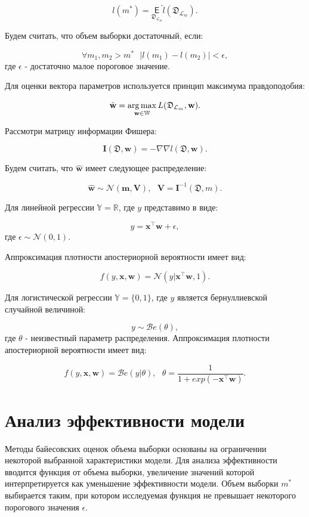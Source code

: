 \documentclass[12pt,twoside]{article}
\begin{document}
$$
l(m^*) = \underset{\mathfrak D_{\mathcal L_m}}{\mathsf E} \tilde{l}(\mathfrak D_{\mathcal L_m}).
$$

Будем считать, что объем выборки достаточный, если:

$$
\forall m_1, m_2 > m^* ~~~ |l(m_1) - l(m_2)| < \epsilon,
$$
где $\epsilon$ - достаточно малое пороговое значение.


Для оценки вектора параметров используется принцип максимума правдоподобия:

$$
\hat{\textbf{w}} = \argmax_{\textbf{w} \in \mathbb{W}} L(\mathfrak D_{\mathcal L_m}, \textbf{w}).
$$

Рассмотри матрицу информации Фишера:

$$
\textbf{I}(\mathfrak D, \textbf{w}) = -\nabla\nabla l(\mathfrak D, \textbf{w}).
$$

Будем считать, что $\hat{\textbf{w}}$ имеет следующее распределение:

$$
\hat{\textbf{w}} \sim \mathcal{N}(\textbf{m}, \textbf{V}),~~~ \textbf{V} = \textbf{I}^{-1}(\mathfrak D, m).
$$

Для линейной регрессии $\mathbb{Y} = \mathbb{R}$, где $y$ представимо в виде:

$$
y = \textbf{x}^{\top}\textbf{w} + \epsilon,
$$
где $\epsilon \sim \mathcal{N}(0, 1)$. 

Аппроксимация плотности апостериорной вероятности имеет вид:

$$
f(y, \textbf{x}, \textbf{w}) = \mathcal{N}(y|\textbf{x}^{\top}\textbf{w}, 1).
$$ 

Для логистической регрессии $\mathbb{Y} = \{0, 1\}$, где $y$ является бернуллиевской случайной величиной:

$$
y \sim \mathcal{B}e(\theta),
$$
где $\theta$ - неизвестный параметр распределения. Аппроксимация плотности апостериорной вероятности имеет вид:

$$
f(y, \textbf{x}, \textbf{w}) = \mathcal{B}e(y|\theta),~~~ \theta = \frac{1}{1 + exp(-\textbf{x}^{\top}\textbf{w})}.
$$

\section{Анализ эффективности модели}

Методы байесовских оценок объема выборки основаны на ограничении некоторой выбранной характеристики модели. Для анализа эффективности вводится функция от объема выборки, увеличение значений которой интерпретируется как уменьшение эффективности модели. Объем выборки $m^{*}$ выбирается таким, при котором исследуемая функция не превышает некоторого порогового значения $\epsilon$.
\end{document}
